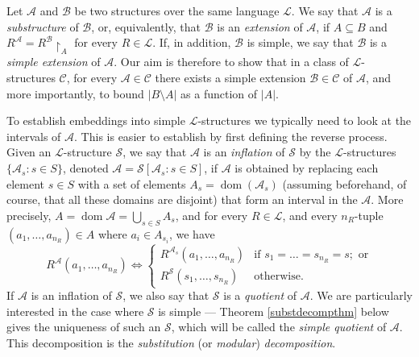\documentclass[11pt]{article}
\begin{document}
Let $\mathcal{A}$ and $\mathcal{B}$ be two structures over the same language $\mathcal{L}$.
We say that $\mathcal{A}$ is a \emph{substructure} of $\mathcal{B}$, or, equivalently, that
$\mathcal{B}$ is an \emph{extension} of $\mathcal{A}$, if $A\subseteq B$ and
$R^{\mathcal{A}}=R^{\mathcal{B}}\!\!\restriction_{A}$ for every $R\in\mathcal{L}$.
If, in addition, $\mathcal{B}$ is simple, we say that $\mathcal{B}$ is a \emph{simple extension} of $\mathcal{A}$.   Our aim is therefore to show that in a class of $\mathcal{L}$-structures $\mathcal{C}$, for every $\mathcal{A}\in\mathcal{C}$ there exists
a simple extension $\mathcal{B}\in\mathcal{C}$ of $\mathcal{A}$, and more importantly, to bound $|B\setminus A|$ as a function of $|A|$.

To establish embeddings into simple $\mathcal{L}$-structures we typically need to
look at the intervals of $\mathcal{A}$.
This is easier to establish by first defining the reverse
process. Given an $\mathcal{L}$-structure $\mathcal{S}$, we say that $\mathcal{A}$ is an \emph{inflation} of
$\mathcal{S}$ by the $\mathcal{L}$-structures
$\{\mathcal{A}_s : s\in S\}$, denoted
$\mathcal{A}=\mathcal{S}[\mathcal{A}_s:s\in S]$, if
$\mathcal{A}$ is obtained by replacing each element
$s\in S$ with a set of elements $A_s={\operatorname{dom}}(\mathcal{A}_s)$
(assuming beforehand, of course, that all these domains are disjoint) that form an
interval in the $\mathcal{A}$.
More precisely, $A={\operatorname{dom}}{\mathcal{A}}=\bigcup_{s\in S} A_s$, and for every $R\in\mathcal{L}$, and every $n_R$-tuple $(a_1,\ldots,a_{n_R})\in A$ where $a_i\in A_{s_i}$, we have
\begin{displaymath}
R^{\mathcal{A}}(a_1,\ldots,a_{n_R})\Leftrightarrow \left\{
\begin{array}{ll}
R^{\mathcal{A}_s}(a_1,\ldots,a_{n_R}) & \mbox{if } s_1=\ldots=s_{n_R}=s; \mbox{ or}\\
R^{\mathcal{S}}(s_1,\ldots, s_{n_R}) & \mbox{otherwise.}
\end{array} \right.
\end{displaymath}
If $\mathcal{A}$ is an inflation of $\mathcal{S}$, we also say that $\mathcal{S}$ is a
\emph{quotient} of $\mathcal{A}$.
We are particularly interested in the case where $\mathcal{S}$ is
simple --- Theorem \ref{substdecompthm} below gives the uniqueness of such an $\mathcal{S}$,
which will be called the \emph{simple quotient} of $\mathcal{A}$. This decomposition is the \emph{substitution} (or \emph{modular}) \emph{decomposition}.
\end{document}
